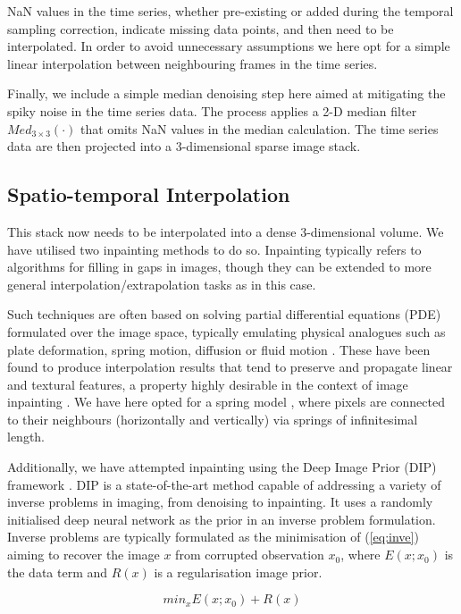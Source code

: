 \documentclass{article}
\begin{document}
NaN values in the time series, whether pre-existing or added during the temporal sampling correction, indicate missing data points, and then need to be interpolated. In order to avoid unnecessary assumptions we here opt for a simple linear interpolation between neighbouring frames in the time series.

Finally, we include a simple median denoising step here aimed at mitigating the spiky noise in the time series data. The process applies a 2-D median filter $Med_{3\times3}(\cdot)$ that omits NaN values in the median calculation.  The time series data are then projected into a 3-dimensional sparse image stack. 



\subsection{Spatio-temporal Interpolation}

This stack now needs to be interpolated into a dense 3-dimensional volume. We have utilised two inpainting methods to do so. Inpainting typically refers to algorithms for filling in gaps in images, though they can be extended to more general interpolation/extrapolation tasks as in this case. 

Such techniques are often based on solving partial differential equations (PDE) formulated over the image space, typically emulating physical analogues such as plate deformation, spring motion, diffusion or fluid motion \cite{Crema}. These have been found to produce interpolation results that tend to preserve and propagate linear and textural features, a property highly desirable in the context of image inpainting \cite{Chan}. We have here opted for a spring model \cite{DERICO}, where pixels are connected to their neighbours (horizontally and vertically) via springs of infinitesimal length. 

Additionally, we have attempted inpainting using the Deep Image Prior (DIP) framework \cite{DIP}. DIP is a state-of-the-art method capable of addressing a variety of inverse problems in imaging, from denoising to inpainting. It uses a randomly initialised deep neural network as the prior in an inverse problem formulation. Inverse problems are typically formulated as the minimisation of (\ref{eq:inve}) aiming to recover the image $x$ from corrupted observation $x_0$, where $E(x;x_0)$ is the data term and $R(x)$ is a regularisation image prior.

\begin{equation}
min_x E(x;x_0) + R(x)
\label{eq:inve}
\end{equation}
\end{document}
